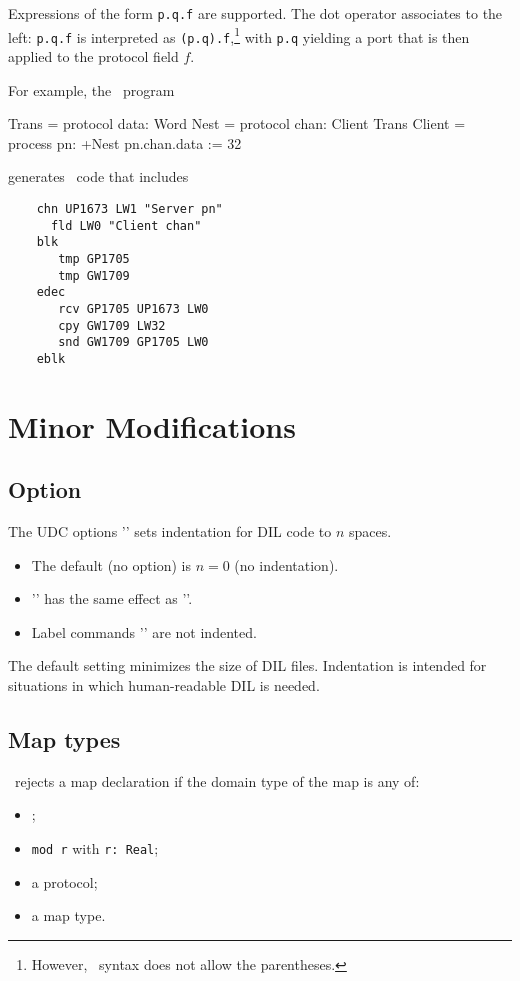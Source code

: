 \documentclass{scrartcl}
\begin{document}
Expressions of the form \lstinline'p.q.f' are supported.  The dot operator associates to the left: \lstinline'p.q.f' is interpreted as \lstinline'(p.q).f',\footnote{However, \desi\ syntax does not allow the parentheses.} with \lstinline'p.q' yielding a port that is then applied to the protocol field $f$.

For example, the \desi\ program
\begin{code}
Trans = protocol { data: Word }
Nest = protocol { chan: Client Trans }
Client = process pn: +Nest {
   pn.chan.data := 32
}
\end{code}
generates \dil\ code that includes
\begin{verbatim}
    chn UP1673 LW1 "Server pn"
      fld LW0 "Client chan"
    blk
       tmp GP1705
       tmp GW1709
    edec
       rcv GP1705 UP1673 LW0
       cpy GW1709 LW32
       snd GW1709 GP1705 LW0
    eblk
\end{verbatim}

\section{Minor Modifications}


\subsection{ Option}

The UDC options '' sets indentation for DIL code to $n$ spaces.
\begin{itemize}
	\item The default (no  option) is $n=0$ (no indentation).
	\item '' has the same effect as ''.
	\item Label commands '' are not indented.
\end{itemize}

The default setting minimizes the size of DIL files.  Indentation is intended for situations in which human-readable DIL is needed.


\subsection{Map types}

\udc\ rejects a map declaration if the domain type of the map is any of:
\begin{itemize}
	\item {};
	\item \lstinline'mod r' with \lstinline'r: Real';
	\item a protocol;
	\item a map type.
\end{itemize}
\end{document}
